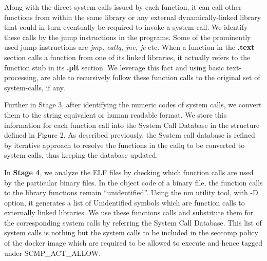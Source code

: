 Along with the direct system calls issued by each function, it can call other functions from within the same library or any external dynamically-linked library that could in-turn eventually be required to invoke a system call. We identify these calls by the jump instructions in the programs. Some of the prominently used jump instructions are \textit{jmp, callq, jne, je} etc. When a function in the \textbf{.text} section calls a function from one of its linked libraries, it actually refers to the function stub in its \textbf{.plt} section. We leverage this fact and using basic text-processing, are able to recursively follow these function calls to the original set of system-calls, if any.

Further in Stage 3, after identifying the numeric codes of system calls, we convert them to the string equivalent or human readable format. We store this information for each function call into the System Call Database in the structure defined in Figure 2. As described previously, the System call database is refined by iterative approach to resolve the functions in the callq to be converted to system calls, thus keeping the database updated.

In \textbf{Stage 4}, we analyze the ELF files by checking which function calls are used by the particular binary files. In the object code of a binary file, the function calls to the library functions remain “unidentified”. Using the nm utility tool, with -D option, it generates a list of Unidentified symbols which are function calls to externally linked libraries. We use these functions calls and substitute them for the corresponding system calls by referring the System Call Database. This list of system calls is nothing but the system calls to be included in the seccomp policy of the docker image which are required to be allowed to execute and hence tagged under SCMP\_ACT\_ALLOW.



